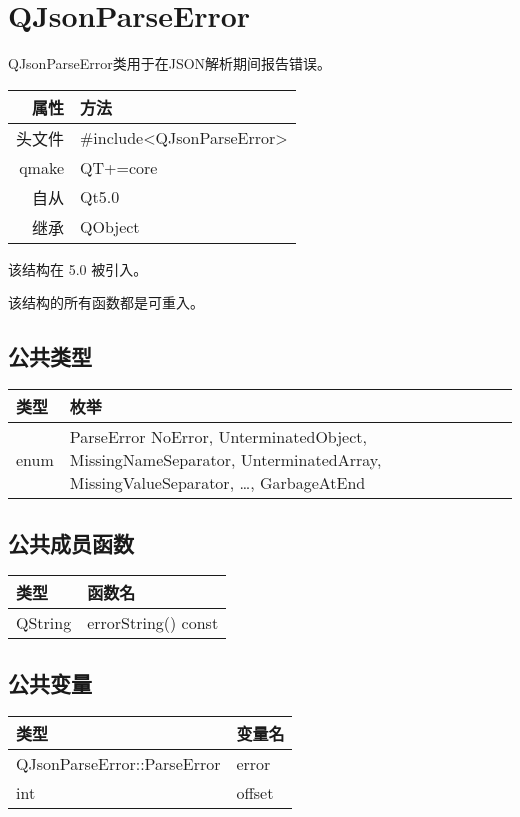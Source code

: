 \chapter{QJsonParseError}

QJsonParseError类用于在JSON解析期间报告错误。

\begin{tabular}{|r|l|}
	\hline
	属性 & 方法 \\
	\hline
	头文件 & \#include<QJsonParseError>\\      
	\hline
	qmake & QT+=core\\      
	\hline
	自从 & Qt5.0\\
	\hline
	继承&QObject \\
	\hline
\end{tabular}

该结构在 5.0 被引入。

 

\begin{notice}
该结构的所有函数都是可重入。
\end{notice}

\section{公共类型}

\begin{tabular}{|l|l|}
	\hline
	类型& 	枚举\\
\hline
enum &	ParseError { NoError, UnterminatedObject, MissingNameSeparator, UnterminatedArray, MissingValueSeparator, …, GarbageAtEnd }\\
	\hline
\end{tabular}


\section{公共成员函数}


\begin{tabular}{|l|l|}
	\hline
类型 &	函数名\\
\hline
QString &	errorString() const\\
	\hline
\end{tabular}


\section{公共变量}

\begin{tabular}{|l|l|}
\hline
类型 	&变量名\\
\hline
QJsonParseError::ParseError& 	error\\
\hline
int 	&offset\\
\hline
\end{tabular}


